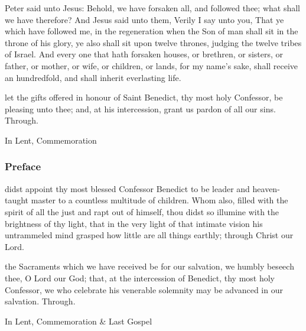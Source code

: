  Peter said unto Jesus: Behold, we have forsaken all, and followed thee; what shall we have therefore? And Jesus said unto them, Verily I say unto you, That ye which have followed me, in the regeneration when the Son of man shall sit in the throne of his glory, ye also shall sit upon twelve thrones, judging the twelve tribes of Israel. And every one that hath forsaken houses, or brethren, or sisters, or father, or mother, or wife, or children, or lands, for my name's sake, shall receive an hundredfold, and shall inherit everlasting life.


\secret
{} let the gifts offered in honour of Saint Benedict, thy most holy Confessor, be pleasing unto thee; and, at his intercession, grant us pardon of all our sins. Through.
\begin{rubric}
    In Lent, Commemoration 
\end{rubric}

\subsubsection{Preface}
 didst appoint thy most blessed Confessor Benedict to be leader and heaven-taught master to a countless multitude of children. Whom also, filled with the spirit of all the just and rapt out of himself, thou didst so illumine with the brightness of thy light, that in the very light of that intimate vision his untrammeled mind grasped how little are all things earthly; through Christ our Lord.


\postcommunion
 the Sacraments which we have received be for our salvation, we humbly beseech thee, O Lord our God; that, at the intercession of Benedict, thy most holy Confessor, we who celebrate his venerable solemnity may be advanced in our salvation. Through.
\begin{rubric}
    In Lent, Commemoration \& Last Gospel 
\end{rubric}


